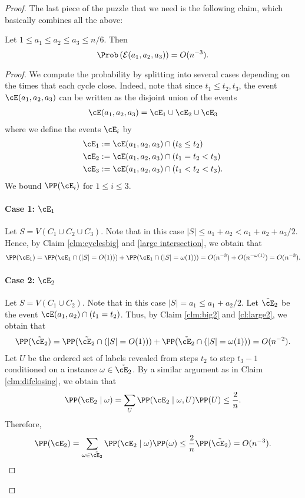 \documentclass{article}
\begin{document}
\begin{proof}
The last piece of the puzzle that we need is the following claim, which basically combines all the above: 

\begin{claim}
    Let $1 \leq a_1\leq a_2 \leq a_3\leq n/6$. Then $$\Prob\left(\mathcal E(a_1,a_2,a_3)\right)=O(n^{-3}).$$
\end{claim}

\begin{proof}
    We compute the probability by splitting into several cases depending on the times that each cycle close. Indeed, note that since $t_1\leq t_2,t_3$, the event $\cE(a_1,a_2,a_3)$ can be written as the disjoint union of the events
    \begin{align*}
        \cE(a_1,a_2,a_3)=\cE_1\cup \cE_2 \cup \cE_3 
    \end{align*}
    where we define the events $\cE_i$ by
    \begin{align*}
        \cE_1&:=\cE(a_1,a_2,a_3)\cap (t_3\leq t_2)\\
        \cE_2&:=\cE(a_1,a_2,a_3)\cap  (t_1=t_2<t_3)\\
        \cE_3&:=\cE(a_1,a_2,a_3)\cap (t_1 < t_2 < t_3).
    \end{align*}
    We bound $\PP(\cE_i)$ for $1\leq i \leq 3$.
    \paragraph{\textbf{Case 1: $\cE_1$}} Let $S=V\left(C_1\cup C_2\cup C_3\right)$. Note that in this case $|S|\leq a_1+a_2<a_1+a_2+a_3/2$. Hence, by Claim \ref{clm:cyclesbig} and \ref{large intersection}, we obtain that
    \begin{align*}
        \PP(\cE_1)=\PP(\cE_1\cap (|S|=O(1)))+\PP(\cE_1\cap (|S|=\omega(1)))=O(n^{-3})+O(n^{-\omega(1)})=O(n^{-3}).
    \end{align*}

    \paragraph{\textbf{Case 2: $\cE_2$}} Let $S=V\left(C_1\cup C_2\right)$. Note that in this case $|S|=a_1\leq a_1+a_2/2$. Let $\tilde{\cE}_2$ be the event $\cE(a_1,a_2)\cap (t_1=t_2)$. Thus, by Claim \ref{clm:big2} and \ref{cl:large2}, we obtain that
    \begin{align*}
        \PP(\tilde{\cE_2})=\PP(\tilde{\cE_2}\cap (|S|=O(1)))+\PP(\tilde{\cE_2}\cap (|S|=\omega(1)))=O(n^{-2}).
    \end{align*}
    Let $U$ be the ordered set of labels revealed from steps $t_2$ to step $t_3-1$ conditioned on a instance $\omega \in \tilde{\cE_2}$. By a similar argument as in Claim \ref{clm:difclosing}, we obtain that
    \begin{align*}
        \PP(\cE_2\mid \omega)=\sum_{U}\PP(\cE_2\mid \omega, U)\PP(U)\leq \frac{2}{n}. 
    \end{align*}
    Therefore,
    \begin{align*}
        \PP(\cE_2)=\sum_{\omega \in \tilde{\cE_2}}\PP(\cE_2\mid \omega)\PP(\omega)\leq \frac{2}{n}\PP(\tilde{\cE_2})=O(n^{-3}).
    \end{align*}


\end{proof}
\end{proof}
\end{document}
